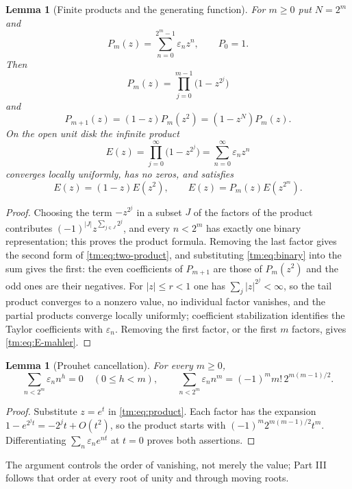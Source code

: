 \documentclass[11pt,a4paper,oneside,openany]{book}
\numberwithin{equation}{chapter}
\newtheorem{lemma}[theorem]{Lemma}
\theoremstyle{definition}
\theoremstyle{remark}
\newcommand{\eps}{\varepsilon}
\begin{document}
\begin{lemma}[Finite products and the generating function]\label{tm:lem:product}
For $m\ge0$ put $N=2^m$ and
\begin{equation}\label{tm:eq:Pm}
 P_m(z)=\sum_{n=0}^{2^m-1}\eps_nz^n,\qquad P_0=1.
\end{equation}
Then
\begin{equation}\label{tm:eq:product}
 P_m(z)=\prod_{j=0}^{m-1}\bigl(1-z^{2^j}\bigr)
\end{equation}
and
\begin{equation}\label{tm:eq:two-product}
 P_{m+1}(z)=(1-z)P_m(z^2)=(1-z^{N})P_m(z).
\end{equation}
On the open unit disk the infinite product
\begin{equation}\label{tm:eq:E}
 E(z)=\prod_{j=0}^{\infty}\bigl(1-z^{2^j}\bigr)=\sum_{n=0}^{\infty}\eps_nz^n
\end{equation}
converges locally uniformly, has no zeros, and satisfies
\begin{equation}\label{tm:eq:E-mahler}
 E(z)=(1-z)E(z^2),\qquad E(z)=P_m(z)E(z^{2^m}).
\end{equation}
\end{lemma}
\begin{proof}
Choosing the term $-z^{2^j}$ in a subset $J$ of the factors of the product
contributes $(-1)^{|J|}z^{\sum_{j\in J}2^j}$, and every $n<2^m$ has exactly
one binary representation; this proves the product formula. Removing the
last factor gives the second form of \eqref{tm:eq:two-product}, and
substituting \eqref{tm:eq:binary} into the sum gives the first: the even
coefficients of $P_{m+1}$ are those of $P_m(z^2)$ and the odd ones are their
negatives. For $|z|\le r<1$ one has $\sum_j|z|^{2^j}<\infty$, so the tail
product converges to a nonzero value, no individual factor vanishes, and
the partial products converge locally uniformly; coefficient stabilization
identifies the Taylor coefficients with $\eps_n$. Removing the first factor,
or the first $m$ factors, gives \eqref{tm:eq:E-mahler}.
\end{proof}

\begin{lemma}[Prouhet cancellation]\label{tm:lem:prouhet}
For every $m\ge0$,
\begin{equation}\label{tm:eq:prouhet}
 \sum_{n<2^m}\eps_nn^h=0\quad(0\le h<m),\qquad
 \sum_{n<2^m}\eps_nn^m=(-1)^mm!\,2^{m(m-1)/2}.
\end{equation}
\end{lemma}
\begin{proof}
Substitute $z=e^t$ in \eqref{tm:eq:product}. Each factor has the expansion
$1-e^{2^jt}=-2^jt+O(t^2)$, so the product starts with
$(-1)^m2^{m(m-1)/2}t^m$. Differentiating $\sum_n\eps_ne^{nt}$ at $t=0$
proves both assertions.
\end{proof}
The argument controls the order of vanishing, not merely the value; Part
III follows that order at every root of unity and through moving roots.
\end{document}
